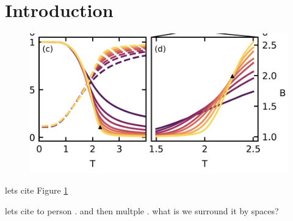 \begin{Shaded}
\begin{Highlighting}[]
\OperatorTok{\%\%}
\end{Highlighting}
\end{Shaded}

\hypertarget{introduction}{%
\section{Introduction}\label{introduction}}

\begin{figure}
\hypertarget{fig:binder}{%
\centering
\includegraphics{figure_code/fk_chapter/binder.png}
\caption{}\label{fig:binder}
}
\end{figure}

lets cite Figure \ref{fig:binder}

lets cite to person \cite{trebstKitaevMaterials2022}. and then
multple
\autocite{banerjeeProximateKitaevQuantum2016,trebstKitaevMaterials2022}.
what is we surround it by spaces? \textcite{trebstKitaevMaterials2022}
